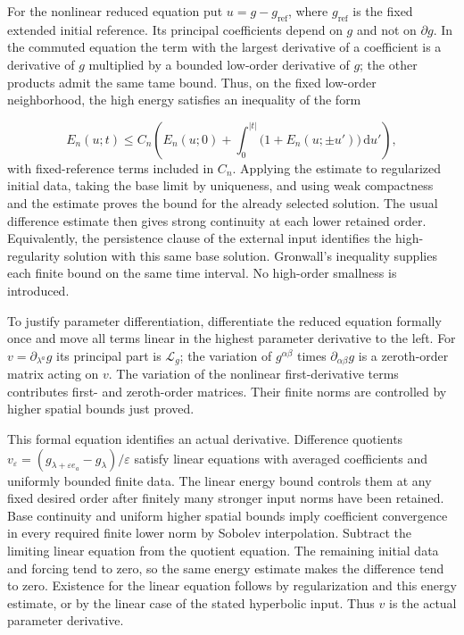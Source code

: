 \documentclass[
  english,
  11pt,
  reqno]{amsart}
\begin{document}
For the nonlinear reduced equation put \(u=g-g_{\mathrm{ref}}\), where
\(g_{\mathrm{ref}}\) is the fixed extended initial reference. Its
principal coefficients depend on \(g\) and not on \(\partial g\). In the
commuted equation the term with the largest derivative of a coefficient
is a derivative of \(g\) multiplied by a bounded low-order derivative of
\(g\); the other products admit the same tame bound. Thus, on the fixed
low-order neighborhood, the high energy satisfies an inequality of the
form

\label{eq:online-reduced-higher-energy-bound} \[
E_n(u;t)\le
C_n\left(E_n(u;0)+
\int_0^{|t|}\bigl(1+E_n(u;\pm u')\bigr)\,\mathrm du'\right),
\] with fixed-reference terms included in \(C_n\). Applying the estimate
to regularized initial data, taking the base limit by uniqueness, and
using weak compactness and the estimate proves the bound for the already
selected solution. The usual difference estimate then gives strong
continuity at each lower retained order. Equivalently, the persistence
clause of the external input identifies the high-regularity solution
with this same base solution. Gronwall's inequality supplies each finite
bound on the same time interval. No high-order smallness is introduced.

To justify parameter differentiation, differentiate the reduced equation
formally once and move all terms linear in the highest parameter
derivative to the left. For \(v=\partial_{\lambda^a}g\) its principal
part is \(\mathcal L_g\); the variation of \(g^{\alpha\beta}\) times
\(\partial_{\alpha\beta}g\) is a zeroth-order matrix acting on \(v\).
The variation of the nonlinear first-derivative terms contributes first-
and zeroth-order matrices. Their finite norms are controlled by higher
spatial bounds just proved.

This formal equation identifies an actual derivative. Difference
quotients
\(v_\varepsilon=(g_{\lambda+\varepsilon e_a}-g_\lambda)/\varepsilon\)
satisfy linear equations with averaged coefficients and uniformly
bounded finite data. The linear energy bound controls them at any fixed
desired order after finitely many stronger input norms have been
retained. Base continuity and uniform higher spatial bounds imply
coefficient convergence in every required finite lower norm by Sobolev
interpolation. Subtract the limiting linear equation from the quotient
equation. The remaining initial data and forcing tend to zero, so the
same energy estimate makes the difference tend to zero. Existence for
the linear equation follows by regularization and this energy estimate,
or by the linear case of the stated hyperbolic input. Thus \(v\) is the
actual parameter derivative.
\end{document}
